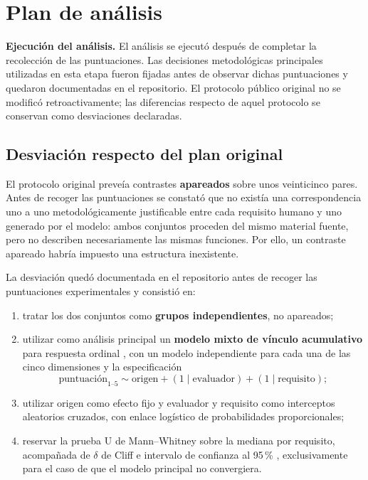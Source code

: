 \documentclass[runningheads]{llncs}
\begin{document}
\section{Plan de an\'alisis}
\label{sec:analisis}

\textbf{Ejecuci\'on del an\'alisis.} El an\'alisis se ejecut\'o despu\'es de
completar la recolecci\'on de las puntuaciones. Las decisiones metodol\'ogicas
principales utilizadas en esta etapa fueron fijadas antes de observar dichas
puntuaciones y quedaron documentadas en el repositorio. El protocolo p\'ublico
original no se modific\'o retroactivamente; las diferencias respecto de aquel
protocolo se conservan como desviaciones declaradas.

\subsection{Desviaci\'on respecto del plan original}

El protocolo original preve\'ia contrastes \textbf{apareados} sobre unos
veinticinco pares. Antes de recoger las puntuaciones se constat\'o que no exist\'ia
una correspondencia uno a uno metodol\'ogicamente justificable entre cada
requisito humano y uno generado por el modelo: ambos conjuntos proceden del mismo
material fuente, pero no describen necesariamente las mismas funciones. Por ello,
un contraste apareado habr\'ia impuesto una estructura inexistente.

La desviaci\'on qued\'o documentada en el repositorio antes de recoger las
puntuaciones experimentales y consisti\'o en:

\begin{enumerate}
\item tratar los dos conjuntos como \textbf{grupos independientes}, no apareados;
\item utilizar como an\'alisis principal un \textbf{modelo mixto de v\'inculo
acumulativo} para respuesta ordinal \cite{agresti2010}, con un modelo independiente
para cada una de las cinco dimensiones y la especificaci\'on
\[
\text{puntuaci\'on}_{1\text{--}5}
\sim
\text{origen}
+
(1 \mid \text{evaluador})
+
(1 \mid \text{requisito});
\]
\item utilizar origen como efecto fijo y evaluador y requisito como interceptos
aleatorios cruzados, con enlace log\'istico de probabilidades proporcionales;
\item reservar la prueba U de Mann--Whitney sobre la mediana por requisito,
acompa\~nada de $\delta$ de Cliff e intervalo de confianza al 95\,\%
\cite{cliff1993}, exclusivamente para el caso de que el modelo principal no
convergiera.
\end{enumerate}
\end{document}
